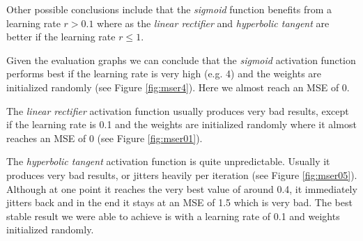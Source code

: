 \documentclass{article}
\begin{document}
Other possible conclusions include that the \emph{sigmoid} function benefits from a learning rate $r>0.1$ where as the \emph{linear rectifier} and \emph{hyperbolic tangent} are better if the learning rate $r\leq1$.

Given the evaluation graphs we can conclude that the \emph{sigmoid} activation function performs best if the learning rate is very high (e.g. 4) and the weights are initialized randomly (see Figure \ref{fig:mser4}).  Here we almost reach an MSE of 0.

The \emph{linear rectifier} activation function usually produces very bad results, except if the learning rate is 0.1 and the weights are initialized randomly where it almost reaches an MSE of 0 (see Figure \ref{fig:mser01}).

The \emph{hyperbolic tangent} activation function is quite unpredictable. Usually it produces very bad results, or jitters heavily per iteration (see Figure \ref{fig:mser05}). Although at one point it reaches the very best value of around 0.4, it immediately jitters back and in the end it stays at an MSE of 1.5 which is very bad.
The best stable result we were able to achieve is with a learning rate of 0.1 and weights initialized randomly.

\end{document}
